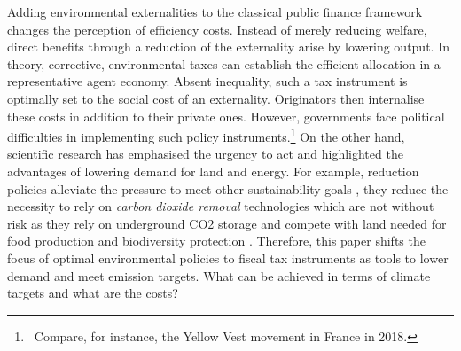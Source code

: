 Adding environmental externalities to the classical public finance framework changes the perception of efficiency costs. Instead of merely reducing welfare, direct benefits through a reduction of the externality arise by lowering output. 
In theory, corrective, environmental taxes can establish the efficient allocation in a representative agent economy. Absent inequality, such a tax instrument is optimally set to the social cost of an externality. Originators then internalise these costs in addition to their private ones. However, governments face political difficulties in implementing such policy instruments.\footnote{\ Compare, for instance, the Yellow Vest movement in France in 2018.} On the other hand, scientific research has emphasised the urgency to act and highlighted the advantages of lowering demand for land and energy.
For example, reduction policies alleviate the pressure to meet other sustainability goals \citep{Bertram2018TargetedScenarios}, they reduce the necessity to rely on \textit{carbon dioxide removal} technologies which are not without risk as they rely on  underground CO2 storage and compete with land needed for food production and biodiversity protection \citep{VanVuuren2018AlternativeTechnologies}.
 Therefore, this paper shifts the focus of optimal environmental policies  to fiscal tax instruments as tools to lower demand and meet emission targets. What can be achieved in terms of climate targets and what are the costs?

